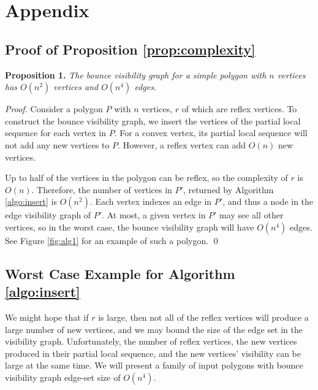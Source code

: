 \documentclass[]{styles/svproc}  %
\begin{document}



\newpage
\section{Appendix}

\begin{appendix}


\section{Proof of Proposition \ref{prop:complexity}}


\textbf{Proposition 1.} {\em The bounce visibility graph for a simple polygon with $n$ vertices has 
$O(n^2)$ vertices and $O(n^4)$ edges.}

\begin{proof}

Consider a polygon $P$ with $n$ vertices, $r$ of which are reflex vertices. To
construct the bounce visibility graph, we insert the vertices of the partial
local sequence for each vertex in $P$. For a convex vertex, its partial local sequence 
will not add any new vertices to $P$. However, a reflex vertex can add $O(n)$ new vertices. 

Up to half of the vertices in the polygon can be reflex, so the complexity of
$r$ is $O(n)$. Therefore, the number of vertices in $P'$, returned by Algorithm
\ref{algo:insert} is $O(n^2)$. Each vertex indexes an edge in $P'$, and
thus a node in the edge visibility graph of $P'$. At most, a given vertex in $P'$ may see all other vertices, so in the worst
case, the bounce visibility graph will have $O(n^4)$ edges. See Figure
\ref{fig:alg1} for an example of such a polygon. \qed

\end{proof}

\subsection{Worst Case Example for Algorithm \ref{algo:insert}}

We might hope that if $r$ is large, then not all of the reflex vertices will
produce a large number of new vertices, and we may bound the size of the edge
set in the visibility graph. Unfortunately, the number of reflex
vertices, the new vertices produced in their partial local sequence, and the new
vertices' visibility can be large at the same time. We will present a family of
input polygons with bounce visibility graph edge-set size of $O(n^4)$.


\end{appendix}
\end{document}
